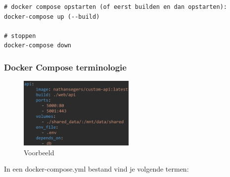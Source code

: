 \documentclass{article}
\begin{document}
\begin{verbatim}
# docker compose opstarten (of eerst builden en dan opstarten):
docker-compose up (--build)

# stoppen
docker-compose down
\end{verbatim}

\subsubsection{Docker Compose terminologie}

\begin{figure}[H]
    \centering
    \includegraphics[width=0.5\textwidth]{docker-compose2.png}
    \caption{Voorbeeld}
\end{figure}


In een docker-compose.yml bestand vind je volgende termen:
\end{document}
